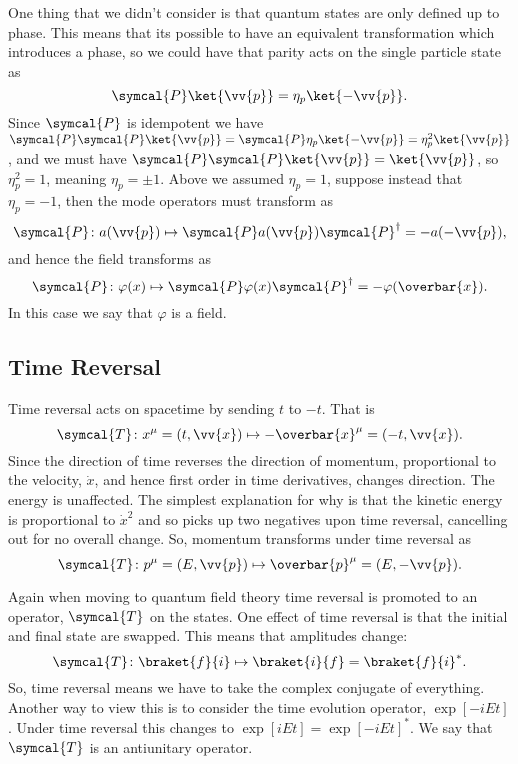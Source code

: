 \documentclass[fleqn]{NotesClass}
\newcommand{\parity}{\symcal{P}}
\newcommand{\timeReversal}{\symcal{T}}
\newcommand{\hermit}{{\dagger}}
\begin{document}
    One thing that we didn't consider is that quantum states are only defined up to phase.
    This means that its possible to have an equivalent transformation which introduces a phase, so we could have that parity acts on the single particle state as
    \begin{equation}
        \parity \ket{\vv{p}} = \eta_{p} \ket{-\vv{p}}.
    \end{equation}
    Since \(\parity\) is idempotent we have \(\parity \parity \ket{\vv{p}} = \parity \eta_p \ket{-\vv{p}} = \eta_p^2 \ket{\vv{p}}\), and we must have \(\parity \parity \ket{\vv{p}} = \ket{\vv{p}}\), so \(\eta_p^2 = 1\), meaning \(\eta_p = \pm 1\).
    Above we assumed \(\eta_p = 1\), suppose instead that \(\eta_p = -1\), then the mode operators must transform as
    \begin{equation}
        \parity \colon a(\vv{p}) \mapsto \parity a(\vv{p}) \parity^\hermit = -a(-\vv{p}),
    \end{equation}
    and hence the field transforms as
    \begin{equation}
        \parity \colon \varphi(x) \mapsto \parity \varphi(x) \parity^\hermit = -\varphi(\overbar{x}).
    \end{equation}
    In this case we say that \(\varphi\) is a  field.
    
    \subsection{Time Reversal}
    Time reversal acts on spacetime by sending \(t\) to \(-t\).
    That is
    \begin{equation}
        \timeReversal \colon x^\mu = (t, \vv{x}) \mapsto -\overbar{x}^\mu = (-t, \vv{x}).
    \end{equation}
    Since the direction of time reverses the direction of momentum, proportional to the velocity, \(\dot{x}\), and hence first order in time derivatives, changes direction.
    The energy is unaffected.
    The simplest explanation for why is that the kinetic energy is proportional to \(\dot{x}^2\) and so picks up two negatives upon time reversal, cancelling out for no overall change.
    So, momentum transforms under time reversal as
    \begin{equation}
        \timeReversal \colon p^\mu = (E, \vv{p}) \mapsto \overbar{p}^\mu = (E, -\vv{p}).
    \end{equation}
    
    Again when moving to quantum field theory time reversal is promoted to an operator, \(\timeReversal\) on the states.
    One effect of time reversal is that the initial and final state are swapped.
    This means that amplitudes change:
    \begin{equation}
        \timeReversal \colon \braket{f}{i} \mapsto \braket{i}{f} = \braket{f}{i}^*.
    \end{equation}
    So, time reversal means we have to take the complex conjugate of everything.
    Another way to view this is to consider the time evolution operator, \(\exp[-iEt]\).
    Under time reversal this changes to \(\exp[iEt] = \exp[-iEt]^*\).
    We say that \(\timeReversal\) is an antiunitary operator.
    
\end{document}
